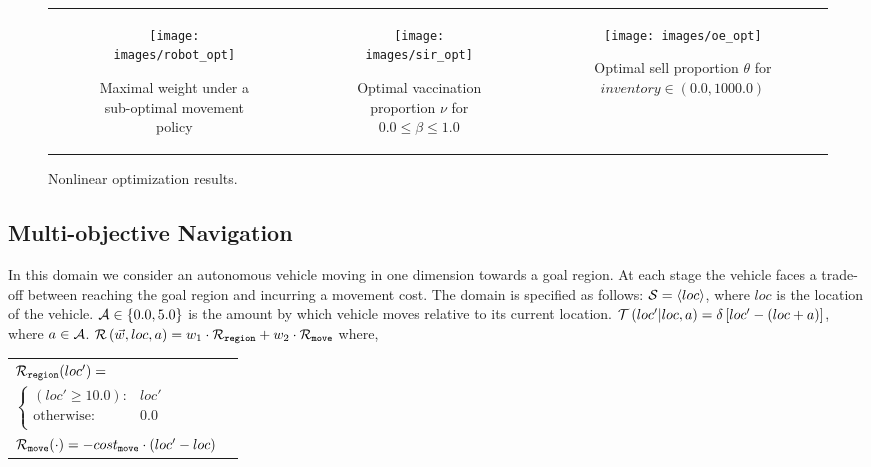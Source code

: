 {\centering
    \begin{figure*}[ht]
        \begin{tabular}{ccc}
            \begin{subfigure}{0.3\textwidth}\centering\texttt{[image: images/robot\_opt]}\caption{Maximal weight under a sub-optimal movement policy}\label{fig:navigation_opt}\end{subfigure}&
            \begin{subfigure}{0.3\textwidth}\centering\texttt{[image: images/sir\_opt]}\caption{Optimal vaccination proportion {\footnotesize $ \nu $} for {\footnotesize $ 0.0 \leq \beta \leq 1.0 $}}\label{fig:sir_opt}\end{subfigure}&
            \begin{subfigure}{0.3\textwidth}\centering\texttt{[image: images/oe\_opt]}\caption{Optimal sell proportion $ \theta $ for {\footnotesize $ inventory \in \left(0.0, 1000.0 \right) $}}\label{fig:oe_opt}\end{subfigure}\\
        \end{tabular}
        \caption{Nonlinear optimization results.}
        \label{tab:opt_results}
    \end{figure*}
}

\subsection{Multi-objective Navigation}
\label{sec:results_navigation}

In this domain we consider an autonomous vehicle moving in one dimension towards a goal region. At each stage the vehicle faces a trade-off between reaching the goal region and incurring a movement cost. The domain is specified as follows: {\footnotesize $ \mathcal{S} = \left\langle loc \right\rangle$}, where $ loc $ is the location of the vehicle. {\footnotesize $ \mathcal{A} \in \left\lbrace 0.0, 5.0 \right\rbrace $} is the amount by which vehicle moves relative to its current location. {\footnotesize $ \mathcal{T}\left( loc' | loc, a \right) = \delta \left[ loc' - (loc + a) \right] $}, where {\footnotesize $ a \in \mathcal{A} $}. {\footnotesize $ \mathcal{R}\left(\vec{w}, loc, a \right) = w_1 \cdot \mathcal{R}_{\mathtt{region}} + w_2 \cdot \mathcal{R}_{\mathtt{move}} $} where,
{\footnotesize 
    \abovedisplayskip=10pt
    \belowdisplayskip=0pt
    \renewcommand{\arraystretch}{1.5}
    \begin{tabular}{ll}    
        $ \mathcal{R}_{\mathtt{region}}(loc') = $ &  $ $ \\
        \qquad $ \begin{cases}
        (loc' \geq 10.0 ) : & loc' \\
        \text{otherwise} : & 0.0 \\
        \end{cases} $ & $ $\\
        $ \mathcal{R}_{\mathtt{move}}(\cdot) = -cost_{\mathtt{move}} \cdot (loc' - loc)$ & $ $ \\                        
    \end{tabular}
} 

